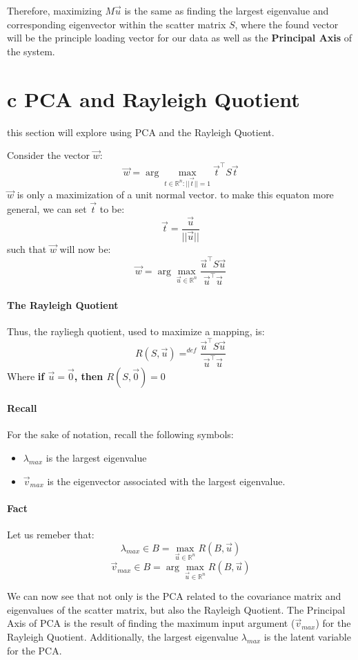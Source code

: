 \documentclass[12pt]{book}
\begin{document}
Therefore, maximizing $M\vec u$ is the same as finding the largest eigenvalue and corresponding 
eigenvector within the scatter matrix $S$, where the found vector will be the principle loading
vector for our data as well as the \textbf{Principal Axis} of the system.

\section*{c PCA and Rayleigh Quotient}
this section will explore using PCA and the Rayleigh Quotient.

Consider the vector $\vec w$:
\[\vec w = \arg\max_{t\in\mathbb{R}^n:||\vec t||=1}\vec t^\top S \vec t\]
$\vec w$ is only a maximization of a unit normal vector. to make this equaton more general, 
we can set $\vec t$ to be:
\[\vec t = \frac{\vec u}{||\vec u||}\]
such that $\vec w$ will now be:
\[\vec w = \arg\max_{\vec u \in \mathbb{R}^n}\frac{\vec u^\top S \vec u}{\vec u^\top \vec u}\]

\paragraph{The Rayleigh Quotient}
Thus, the rayliegh quotient, used to maximize a mapping, is:
\[R(S, \vec u) =^{def} \frac{\vec u^\top S \vec u}{\vec u^\top \vec u}\]
Where \textbf{if $\vec u = \vec 0$, then $R(S, \vec0) = 0$}

\paragraph{Recall}
For the sake of notation, recall the following symbols:
\begin{itemize}
        \item $\lambda_{max}$ is the largest eigenvalue
        \item $\vec v_{max}$ is the eigenvector associated with the largest eigenvalue.
\end{itemize}

\paragraph{Fact}
Let us remeber that:
\[\lambda_{max} \in B =\max_{\vec u \in \mathbb{R}^n} R(B, \vec u)\]
\[\vec v_{max} \in B = \arg\max_{\vec u \in \mathbb{R}^n} R(B, \vec u)\]

We can now see that not only is the PCA related to the covariance matrix and eigenvalues of 
the scatter matrix, but also the Rayleigh Quotient. The Principal Axis of PCA is the result of 
finding the maximum input argument ($\vec v_{max}$) for the Rayleigh Quotient. Additionally, 
the largest eigenvalue $\lambda_{max}$ is the latent variable for the PCA.
\end{document}
